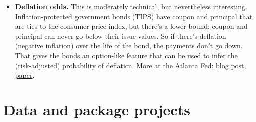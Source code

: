 \documentclass[11pt]{article}
\begin{document}
\begin{itemize}
\item {\bf Deflation odds.}   
This is moderately technical, but nevertheless interesting.  Inflation-protected government bonds (TIPS) have coupon and principal that are ties to the consumer price index, but there’s a lower bound:  coupon and principal can never go below their issue values.  So if there’s deflation (negative inflation) over the life of the bond, the payments don’t go down.  That gives the bonds an option-like feature that can be used to infer the (risk-adjusted) probability of deflation.  More at the Atlanta Fed:
\href{http://macroblog.typepad.com/macroblog/2015/09/5-year-deflation-probability-moves-off-zero.html}
{blog post}, 
\href{https://www.frbatlanta.org/research/inflationproject/dp.aspx?d=1&s=blogmb}
{paper}.  




\end{itemize} 


\section*{Data and package projects}
\end{document}
